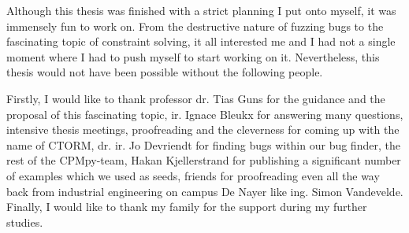 \documentclass[master=cws, masteroption=se, english, oneside]{kulemt} %
\begin{document}
\begin{preface}
	Although this thesis was finished with a strict planning I put onto myself, it was immensely fun to work on. From the destructive nature of fuzzing bugs to the fascinating topic of constraint solving, it all interested me and I had not a single moment where I had to push myself to start working on it. Nevertheless, this thesis would not have been possible without the following people.
	
	
	\noindent Firstly, I would like to thank 
	professor dr. Tias Guns for the guidance and the proposal of this fascinating topic,
	ir. Ignace Bleukx for answering many questions, intensive thesis meetings, proofreading and the cleverness for coming up with the name of CTORM, 
	dr. ir. Jo Devriendt for finding bugs within our bug finder, 
	the rest of the CPMpy-team, 
	Hakan Kjellerstrand for publishing a significant number of examples which we used as seeds,
	friends for proofreading even all the way back from industrial engineering on campus De Nayer like ing. Simon Vandevelde.
	Finally, I would like to thank my family for the support during my further studies.
\end{preface}

\tableofcontents*
\setcounter{tocdepth}{5} %
\end{document}
